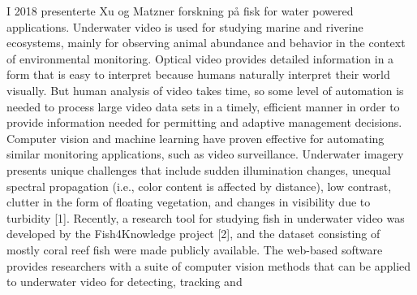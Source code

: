 I 2018 presenterte Xu og Matzner forskning på fisk for water powered applications. Underwater video is used for studying marine and riverine ecosystems, mainly for observing animal abundance and behavior in the context of environmental monitoring.  Optical video provides detailed information in a form that is easy to interpret because humans naturally interpret their world visually.  But human analysis of video takes time, so some level of automation is needed to process large video data sets in a timely, efficient manner in order to provide information needed for permitting and adaptive management decisions.  Computer vision and machine learning have proven effective for automating similar monitoring applications, such as video surveillance.  Underwater imagery presents unique challenges that include sudden illumination changes, unequal spectral propagation (i.e., color content is affected by distance), low contrast, clutter in the form of floating vegetation, and changes in visibility due to turbidity [1].  Recently, a research tool for studying fish in underwater video was developed by the Fish4Knowledge project [2], and the dataset consisting of mostly coral reef fish were made publicly available.  The web-based software provides researchers with a suite of computer vision methods that can be applied to underwater video for detecting, tracking and \cite{Xu og Matzner 2018}


